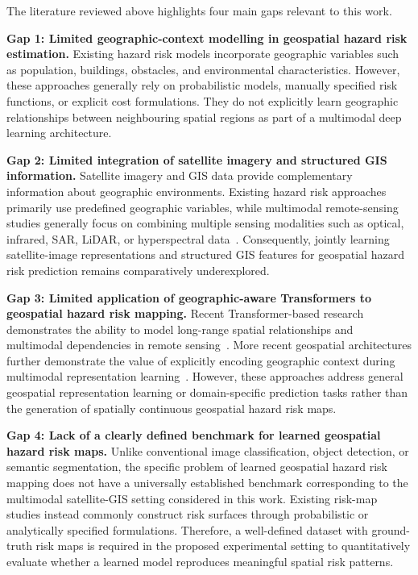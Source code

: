 \documentclass[sigconf, review=true]{acmart}
\begin{document}
The literature reviewed above highlights four main gaps relevant to this work.

\textbf{Gap 1: Limited geographic-context modelling in geospatial hazard risk estimation.} Existing hazard risk models incorporate geographic variables such as population, buildings, obstacles, and environmental characteristics. However, these approaches generally rely on probabilistic models, manually specified risk functions, or explicit cost formulations. They do not explicitly learn geographic relationships between neighbouring spatial regions as part of a multimodal deep learning architecture.

\textbf{Gap 2: Limited integration of satellite imagery and structured GIS information.} Satellite imagery and GIS data provide complementary information about geographic environments. Existing hazard risk approaches primarily use predefined geographic variables, while multimodal remote-sensing studies generally focus on combining multiple sensing modalities such as optical, infrared, SAR, LiDAR, or hyperspectral data~\cite{samadzadegan2025fusion,bahaduri2024multimodal}. Consequently, jointly learning satellite-image representations and structured GIS features for geospatial hazard risk prediction remains comparatively underexplored.

\textbf{Gap 3: Limited application of geographic-aware Transformers to geospatial hazard risk mapping.} Recent Transformer-based research demonstrates the ability to model long-range spatial relationships and multimodal dependencies in remote sensing~\cite{aleissaee2023transformers,wang2024transformers}. More recent geospatial architectures further demonstrate the value of explicitly encoding geographic context during multimodal representation learning~\cite{han2025geofoundation,zermatten2026gamma}. However, these approaches address general geospatial representation learning or domain-specific prediction tasks rather than the generation of spatially continuous geospatial hazard risk maps.

\textbf{Gap 4: Lack of a clearly defined benchmark for learned geospatial hazard risk maps.} Unlike conventional image classification, object detection, or semantic segmentation, the specific problem of learned geospatial hazard risk mapping does not have a universally established benchmark corresponding to the multimodal satellite-GIS setting considered in this work. Existing risk-map studies instead commonly construct risk surfaces through probabilistic or analytically specified formulations. Therefore, a well-defined dataset with ground-truth risk maps is required in the proposed experimental setting to quantitatively evaluate whether a learned model reproduces meaningful spatial risk patterns.
\end{document}
